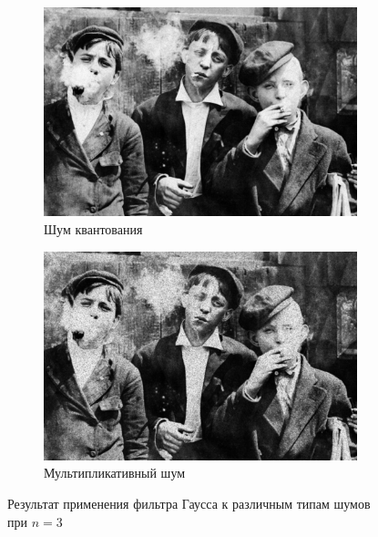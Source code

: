 \begin{figure}[ht!]
\begin{subfigure}[b]{0.5\linewidth}
      \centering
      \includegraphics[width=0.95\linewidth]{../Gaussian_Blur/Gaussian_Blur_Poisson_noise_(3,3).jpg} 
      \caption{Шум квантования} 
      \label{gaussian_3:e}
    \end{subfigure}%
    \begin{subfigure}[b]{0.5\linewidth}
        \centering
        \includegraphics[width=0.95\linewidth]{../Gaussian_Blur/Gaussian_Blur_Speckle_noise_(3,3).jpg} 
        \caption{Мультипликативный шум} 
        \label{gaussian_3:f} 
    \end{subfigure} 
    \caption{Результат применения фильтра Гаусса к различным типам шумов при $n = 3$}
    \label{img:gaussian_3} 
  \end{figure}

